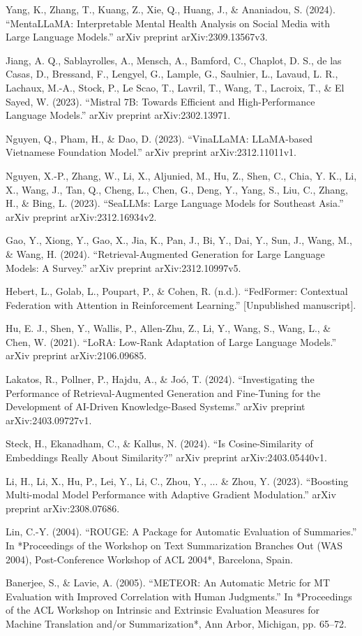 \documentclass[conference]{IEEEtran}
\begin{document}
\begin{thebibliography}{9}
 Yang, K., Zhang, T., Kuang, Z., Xie, Q., Huang, J., \& Ananiadou, S. (2024). ``MentaLLaMA: Interpretable Mental Health Analysis on Social Media with Large Language Models.'' arXiv preprint arXiv:2309.13567v3.

 Jiang, A. Q., Sablayrolles, A., Mensch, A., Bamford, C., Chaplot, D. S., de las Casas, D., Bressand, F., Lengyel, G., Lample, G., Saulnier, L., Lavaud, L. R., Lachaux, M.-A., Stock, P., Le Scao, T., Lavril, T., Wang, T., Lacroix, T., \& El Sayed, W. (2023). ``Mistral 7B: Towards Efficient and High-Performance Language Models.'' arXiv preprint arXiv:2302.13971.

 Nguyen, Q., Pham, H., \& Dao, D. (2023). ``VinaLLaMA: LLaMA-based Vietnamese Foundation Model.'' arXiv preprint arXiv:2312.11011v1.

 Nguyen, X.-P., Zhang, W., Li, X., Aljunied, M., Hu, Z., Shen, C., Chia, Y. K., Li, X., Wang, J., Tan, Q., Cheng, L., Chen, G., Deng, Y., Yang, S., Liu, C., Zhang, H., \& Bing, L. (2023). ``SeaLLMs: Large Language Models for Southeast Asia.'' arXiv preprint arXiv:2312.16934v2.

 Gao, Y., Xiong, Y., Gao, X., Jia, K., Pan, J., Bi, Y., Dai, Y., Sun, J., Wang, M., \& Wang, H. (2024). ``Retrieval-Augmented Generation for Large Language Models: A Survey.'' arXiv preprint arXiv:2312.10997v5.

 Hebert, L., Golab, L., Poupart, P., \& Cohen, R. (n.d.). ``FedFormer: Contextual Federation with Attention in Reinforcement Learning.'' [Unpublished manuscript].

 Hu, E. J., Shen, Y., Wallis, P., Allen-Zhu, Z., Li, Y., Wang, S., Wang, L., \& Chen, W. (2021). ``LoRA: Low-Rank Adaptation of Large Language Models.'' arXiv preprint arXiv:2106.09685.

 Lakatos, R., Pollner, P., Hajdu, A., \& Joó, T. (2024). ``Investigating the Performance of Retrieval-Augmented Generation and Fine-Tuning for the Development of AI-Driven Knowledge-Based Systems.'' arXiv preprint arXiv:2403.09727v1.

 Steck, H., Ekanadham, C., \& Kallus, N. (2024). ``Is Cosine-Similarity of Embeddings Really About Similarity?'' arXiv preprint arXiv:2403.05440v1.

 Li, H., Li, X., Hu, P., Lei, Y., Li, C., Zhou, Y., ... \& Zhou, Y. (2023). ``Boosting Multi-modal Model Performance with Adaptive Gradient Modulation.'' arXiv preprint arXiv:2308.07686.

 Lin, C.-Y. (2004). ``ROUGE: A Package for Automatic Evaluation of Summaries.'' In *Proceedings of the Workshop on Text Summarization Branches Out (WAS 2004), Post-Conference Workshop of ACL 2004*, Barcelona, Spain.

 Banerjee, S., \& Lavie, A. (2005). ``METEOR: An Automatic Metric for MT Evaluation with Improved Correlation with Human Judgments.'' In *Proceedings of the ACL Workshop on Intrinsic and Extrinsic Evaluation Measures for Machine Translation and/or Summarization*, Ann Arbor, Michigan, pp. 65--72.

\end{thebibliography}
\end{document}
